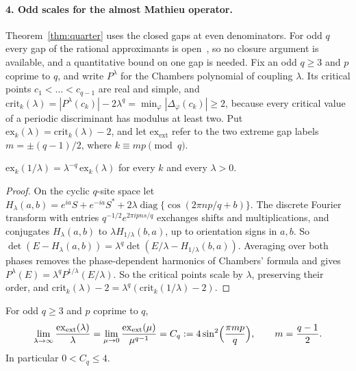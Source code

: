 \paragraph{4. Odd scales for the almost Mathieu operator.} Theorem~\ref{thm:quarter} uses the closed gaps at even denominators. For odd $q$ every gap of the rational approximants is open~\cite{vanMouche1989}, so no closure argument is available, and a quantitative bound on one gap is needed. Fix an odd $q\ge3$ and $p$ coprime to $q$, and write $P^\lambda$ for the Chambers polynomial of coupling $\lambda$. Its critical points $c_1<\dots<c_{q-1}$ are real and simple, and $\mathrm{crit}_k(\lambda)=|P^\lambda(c_k)|-2\lambda^q=\min_\varphi|\Delta_\varphi(c_k)|\ge2$, because every critical value of a periodic discriminant has modulus at least two. Put $\mathrm{ex}_k(\lambda)=\mathrm{crit}_k(\lambda)-2$, and let $\mathrm{ex}_{\mathrm{ext}}$ refer to the two extreme gap labels $m=\pm(q-1)/2$, where $k\equiv mp\pmod q$.

\begin{lemma}\label{lem:X}
$\mathrm{ex}_k(1/\lambda)=\lambda^{-q}\,\mathrm{ex}_k(\lambda)$ for every $k$ and every $\lambda>0$.
\end{lemma}

\begin{proof}
On the cyclic $q$-site space let $H_\lambda(a,b)=e^{ia}S+e^{-ia}S^*+2\lambda\operatorname{diag}\{\cos(2\pi np/q+b)\}$. The discrete Fourier transform with entries $q^{-1/2}e^{2\pi ipns/q}$ exchanges shifts and multiplications, and conjugates $H_\lambda(a,b)$ to $\lambda H_{1/\lambda}(b,a)$, up to orientation signs in $a,b$. So $\det(E-H_\lambda(a,b))=\lambda^q\det(E/\lambda-H_{1/\lambda}(b,a))$. Averaging over both phases removes the phase-dependent harmonics of Chambers' formula and gives $P^\lambda(E)=\lambda^qP^{1/\lambda}(E/\lambda)$. So the critical points scale by $\lambda$, preserving their order, and $\mathrm{crit}_k(\lambda)-2=\lambda^q(\mathrm{crit}_k(1/\lambda)-2)$.
\end{proof}

\begin{proposition}\label{prop:X2}
For odd $q\ge3$ and $p$ coprime to $q$,
\[
\lim_{\lambda\to\infty}\frac{\mathrm{ex}_{\mathrm{ext}}(\lambda)}{\lambda}=\lim_{\mu\to0}\frac{\mathrm{ex}_{\mathrm{ext}}(\mu)}{\mu^{q-1}}=C_q:=4\sin^2\Bigl(\frac{\pi mp}q\Bigr),\qquad m=\frac{q-1}2 .
\]
In particular $0<C_q\le4$.
\end{proposition}

